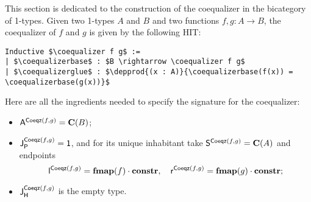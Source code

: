 This section is dedicated to the construction of the coequalizer in
the bicategory of 1-types.  Given two 1-types $A$ and $B$ and two
functions $f , g: A \to B$, the coequalizer of $f$ and $g$ is
given by the following HIT:
\begin{lstlisting}[mathescape=true]
Inductive $\coequalizer f g$ :=
| $\coequalizerbase$ : $B \rightarrow \coequalizer f g$
| $\coequalizerglue$ : $\depprod{(x : A)}{\coequalizerbase(f(x)) = \coequalizerbase(g(x))}$
\end{lstlisting}

Here are all the ingredients needed to specify the signature for the coequalizer:
\begin{itemize}
\item $\pointconstr[\coequalizer f g] = \constantP{B}$;
\item $\pathlabel[\coequalizer f g] = \unit$, and for its unique inhabitant take $\patharg[\coequalizer f g] = \constantP{A}$ and endpoints
  \[
  \pathleft[\coequalizer f g] = \comp{\fmap(f)}{\constr}, \quad
  \pathright[\coequalizer f g] = \comp{\fmap(g)}{\constr}; 
  \]
\item $\homotlabel[\coequalizer f g]$ is the empty type.
\end{itemize}




